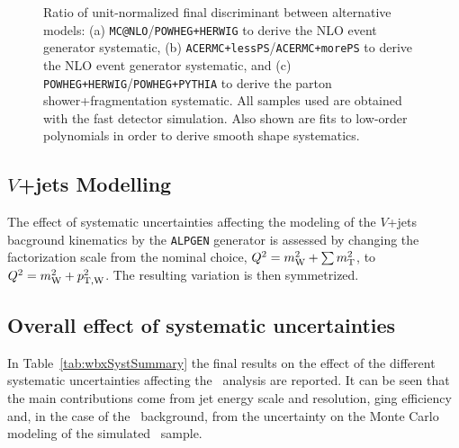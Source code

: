 \begin{figure}[htb]\begin{center}
	\caption{Ratio of unit-normalized final discriminant between alternative models:
(a) \texttt{MC@NLO}/\texttt{POWHEG+HERWIG}  to derive the NLO event generator systematic,
(b) \texttt{ACERMC+lessPS}/\texttt{ACERMC+morePS}  to derive the NLO event generator systematic, and
(c) \texttt{POWHEG+HERWIG}/\texttt{POWHEG+PYTHIA}  to derive the parton shower+fragmentation systematic.
All samples used are obtained with the fast detector simulation.
Also shown are fits to low-order polynomials in order to derive smooth shape systematics.
\label{fig:ttbarmodel_ratios}}
\end{center}\end{figure}


\subsection{$V$+jets Modelling}

The effect of systematic uncertainties affecting the 
modeling of the $V$+jets bacground kinematics by the \texttt{ALPGEN}
generator is assessed by changing the factorization scale from the nominal
choice, $Q^2 =m_{\rm W}^2+\sum m_{\rm T}^2$, to $Q^2 =m_{\rm W}^2+p_{\rm T,W}^2$. 
The resulting variation is then symmetrized.



\subsection{Overall effect of systematic uncertainties}\label{sec:wbxALLSYS}

In Table~\ref{tab:wbxSystSummary} the final results on
the effect of the different systematic uncertainties affecting
the \wbx\ analysis are reported. It can be seen that the main
contributions come from jet energy scale and resolution,
\btag ging efficiency and, in the case of the \ttbar\ 
background, from the uncertainty on the Monte Carlo modeling
of the simulated \ttbar\ sample.


